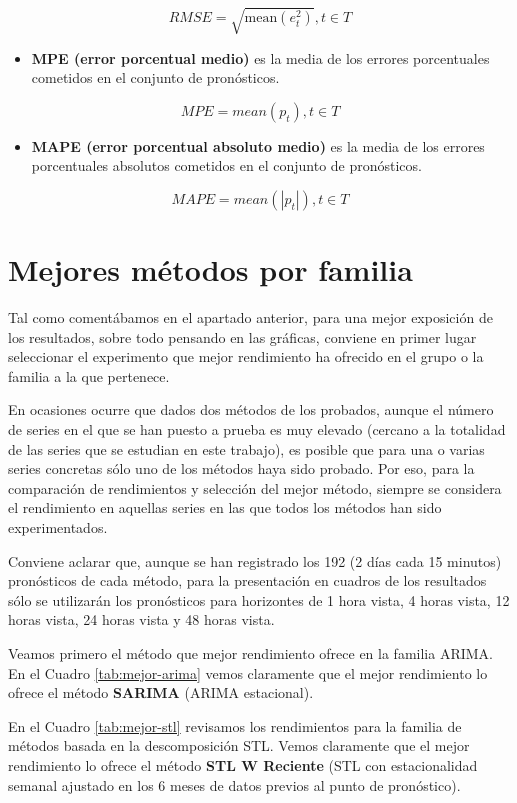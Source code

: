 \documentclass[]{book}
\providecommand{\tightlist}{%
  \setlength{\itemsep}{0pt}\setlength{\parskip}{0pt}}
\begin{document}
\[ RMSE = \sqrt{\text{mean}(e_t^2)}, t\in T \]

\begin{itemize}
\tightlist
\item
  \textbf{MPE (error porcentual medio)} es la media de los errores
  porcentuales cometidos en el conjunto de pronósticos.
\end{itemize}

\[ MPE = mean(p_t), t\in T \]

\begin{itemize}
\tightlist
\item
  \textbf{MAPE (error porcentual absoluto medio)} es la media de los
  errores porcentuales absolutos cometidos en el conjunto de
  pronósticos.
\end{itemize}

\[ MAPE = mean(|p_t|), t\in T \]

\section{Mejores métodos por familia}\label{mejores-metodos-por-familia}

Tal como comentábamos en el apartado anterior, para una mejor exposición
de los resultados, sobre todo pensando en las gráficas, conviene en
primer lugar seleccionar el experimento que mejor rendimiento ha
ofrecido en el grupo o la familia a la que pertenece.

En ocasiones ocurre que dados dos métodos de los probados, aunque el
número de series en el que se han puesto a prueba es muy elevado
(cercano a la totalidad de las series que se estudian en este trabajo),
es posible que para una o varias series concretas sólo uno de los
métodos haya sido probado. Por eso, para la comparación de rendimientos
y selección del mejor método, siempre se considera el rendimiento en
aquellas series en las que todos los métodos han sido experimentados.

Conviene aclarar que, aunque se han registrado los 192 (2 días cada 15
minutos) pronósticos de cada método, para la presentación en cuadros de
los resultados sólo se utilizarán los pronósticos para horizontes de 1
hora vista, 4 horas vista, 12 horas vista, 24 horas vista y 48 horas
vista.

Veamos primero el método que mejor rendimiento ofrece en la familia
ARIMA. En el Cuadro \ref{tab:mejor-arima} vemos claramente que el mejor
rendimiento lo ofrece el método \textbf{SARIMA} (ARIMA estacional).

En el Cuadro \ref{tab:mejor-stl} revisamos los rendimientos para la
familia de métodos basada en la descomposición STL. Vemos claramente que
el mejor rendimiento lo ofrece el método \textbf{STL W Reciente} (STL
con estacionalidad semanal ajustado en los 6 meses de datos previos al
punto de pronóstico).
\end{document}
